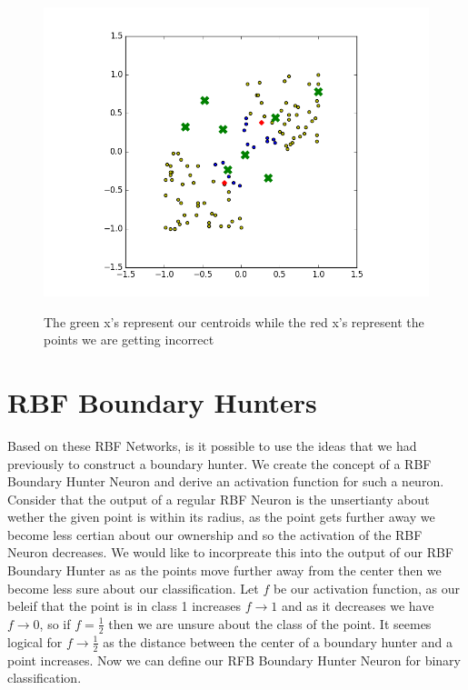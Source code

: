 \documentclass{article}
\theoremstyle{definition}
\begin{document}
\begin{figure}[H]
\begin{minipage}[b]{0.4\textwidth}
    \includegraphics[width=\textwidth]{RBFN-03.png}
    \caption{}
  \end{minipage}
  \hfill

The green x's represent our centroids while the red x's represent the points we are getting incorrect
\end{figure}

\newpage

\section{RBF Boundary Hunters}
Based on these RBF Networks, is it possible to use the ideas that we had previously to construct a boundary hunter. We create the concept of a RBF Boundary Hunter Neuron and derive an activation function for such a neuron.\\

Consider that the output of a regular RBF Neuron is the unsertianty about wether the given point is within its radius, as the point gets further away we become less certian about our ownership and so the activation of the RBF Neuron decreases. We would like to incorpreate this into the output of our RBF Boundary Hunter as as the points move further away from the center then we become less sure about our classification. Let $f$ be our activation function, as our beleif that the point is in class 1 increases $f \rightarrow 1$ and as it decreases we have $f \rightarrow 0$, so if $f = \frac{1}{2}$ then we are unsure about the class of the point. It seemes logical for $f \rightarrow \frac{1}{2}$ as the distance between the center of a boundary hunter and a point increases. Now we can define our RFB Boundary Hunter Neuron for binary classification.\\
\end{document}
